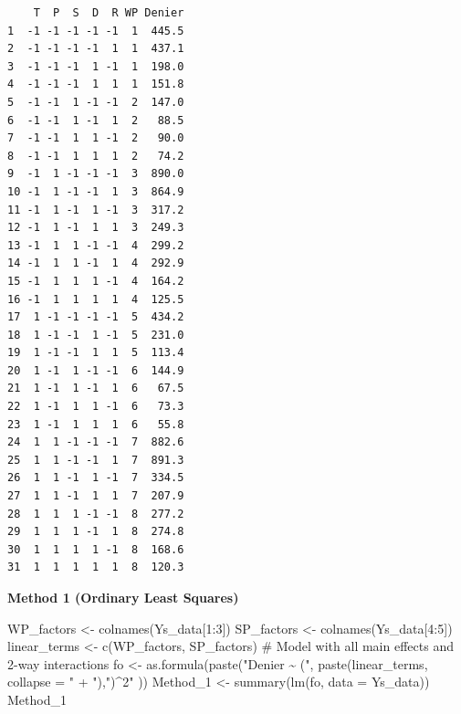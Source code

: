 \documentclass[
  letterpaper,
  DIV=11,
  numbers=noendperiod]{scrartcl}
\newenvironment{Shaded}{\begin{snugshade}}{\end{snugshade}}
\newcommand{\AttributeTok}[1]{\textcolor[rgb]{0.40,0.45,0.13}{#1}}
\newcommand{\CommentTok}[1]{\textcolor[rgb]{0.37,0.37,0.37}{#1}}
\newcommand{\DecValTok}[1]{\textcolor[rgb]{0.68,0.00,0.00}{#1}}
\newcommand{\FunctionTok}[1]{\textcolor[rgb]{0.28,0.35,0.67}{#1}}
\newcommand{\NormalTok}[1]{\textcolor[rgb]{0.00,0.23,0.31}{#1}}
\newcommand{\OtherTok}[1]{\textcolor[rgb]{0.00,0.23,0.31}{#1}}
\newcommand{\SpecialCharTok}[1]{\textcolor[rgb]{0.37,0.37,0.37}{#1}}
\newcommand{\StringTok}[1]{\textcolor[rgb]{0.13,0.47,0.30}{#1}}
\begin{document}
\begin{verbatim}
    T  P  S  D  R WP Denier
1  -1 -1 -1 -1 -1  1  445.5
2  -1 -1 -1 -1  1  1  437.1
3  -1 -1 -1  1 -1  1  198.0
4  -1 -1 -1  1  1  1  151.8
5  -1 -1  1 -1 -1  2  147.0
6  -1 -1  1 -1  1  2   88.5
7  -1 -1  1  1 -1  2   90.0
8  -1 -1  1  1  1  2   74.2
9  -1  1 -1 -1 -1  3  890.0
10 -1  1 -1 -1  1  3  864.9
11 -1  1 -1  1 -1  3  317.2
12 -1  1 -1  1  1  3  249.3
13 -1  1  1 -1 -1  4  299.2
14 -1  1  1 -1  1  4  292.9
15 -1  1  1  1 -1  4  164.2
16 -1  1  1  1  1  4  125.5
17  1 -1 -1 -1 -1  5  434.2
18  1 -1 -1  1 -1  5  231.0
19  1 -1 -1  1  1  5  113.4
20  1 -1  1 -1 -1  6  144.9
21  1 -1  1 -1  1  6   67.5
22  1 -1  1  1 -1  6   73.3
23  1 -1  1  1  1  6   55.8
24  1  1 -1 -1 -1  7  882.6
25  1  1 -1 -1  1  7  891.3
26  1  1 -1  1 -1  7  334.5
27  1  1 -1  1  1  7  207.9
28  1  1  1 -1 -1  8  277.2
29  1  1  1 -1  1  8  274.8
30  1  1  1  1 -1  8  168.6
31  1  1  1  1  1  8  120.3
\end{verbatim}

\textbf{Method 1 (Ordinary Least Squares)}

\begin{Shaded}
\begin{Highlighting}[]
\NormalTok{WP\_factors }\OtherTok{\textless{}{-}} \FunctionTok{colnames}\NormalTok{(Ys\_data[}\DecValTok{1}\SpecialCharTok{:}\DecValTok{3}\NormalTok{])}
\NormalTok{SP\_factors }\OtherTok{\textless{}{-}} \FunctionTok{colnames}\NormalTok{(Ys\_data[}\DecValTok{4}\SpecialCharTok{:}\DecValTok{5}\NormalTok{])}
\NormalTok{linear\_terms }\OtherTok{\textless{}{-}} \FunctionTok{c}\NormalTok{(WP\_factors, SP\_factors)}
\CommentTok{\# Model with all main effects and 2{-}way interactions}
\NormalTok{fo }\OtherTok{\textless{}{-}} \FunctionTok{as.formula}\NormalTok{(}\FunctionTok{paste}\NormalTok{(}\StringTok{"Denier \textasciitilde{} ("}\NormalTok{, }
    \FunctionTok{paste}\NormalTok{(linear\_terms, }\AttributeTok{collapse =} \StringTok{" + "}\NormalTok{),}\StringTok{")\^{}2"}
\NormalTok{  ))}
\NormalTok{Method\_1 }\OtherTok{\textless{}{-}} \FunctionTok{summary}\NormalTok{(}\FunctionTok{lm}\NormalTok{(fo, }\AttributeTok{data =}\NormalTok{ Ys\_data))}
\NormalTok{Method\_1}
\end{Highlighting}
\end{Shaded}
\end{document}
